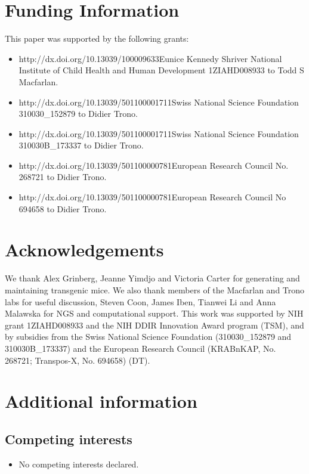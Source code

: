 \documentclass[11pt,a4paper]{article}
\begin{document}
\section{Funding Information}

This paper was supported by the following grants:

\begin{itemize}
\item http://dx.doi.org/10.13039/100009633Eunice Kennedy Shriver National Institute of Child Health and Human Development 1ZIAHD008933 to Todd S Macfarlan.
\item http://dx.doi.org/10.13039/501100001711Swiss National Science Foundation 310030\_152879 to Didier Trono.
\item http://dx.doi.org/10.13039/501100001711Swiss National Science Foundation 310030B\_173337 to Didier Trono.
\item http://dx.doi.org/10.13039/501100000781European Research Council No. 268721 to Didier Trono.
\item http://dx.doi.org/10.13039/501100000781European Research Council No 694658 to Didier Trono.
\end{itemize}

\section{Acknowledgements}

We thank Alex Grinberg, Jeanne Yimdjo and Victoria Carter for generating and maintaining transgenic mice. We also thank members of the Macfarlan and Trono labs for useful discussion, Steven Coon, James Iben, Tianwei Li and Anna Malawska for NGS and computational support. This work was supported by NIH grant 1ZIAHD008933 and the NIH DDIR Innovation Award program (TSM), and by subsidies from the Swiss National Science Foundation (310030\_152879 and 310030B\_173337) and the European Research Council (KRABnKAP, No. 268721; Transpos-X, No. 694658) (DT).

\section{Additional information}

\subsection{Competing interests}

\begin{itemize}
\item No competing interests declared.
\end{itemize}
\end{document}
